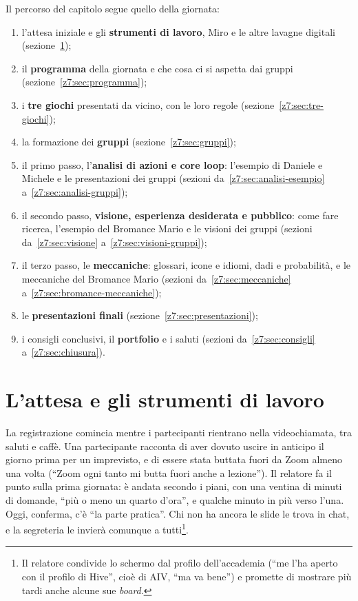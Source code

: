 Il percorso del capitolo segue quello della giornata:
\begin{enumerate}
  \item l'attesa iniziale e gli \textbf{strumenti di lavoro}, Miro e le altre
        lavagne digitali (sezione~\ref{z7:sec:avvio});
  \item il \textbf{programma} della giornata e che cosa ci si aspetta dai gruppi
        (sezione~\ref{z7:sec:programma});
  \item i \textbf{tre giochi} presentati da vicino, con le loro regole
        (sezione~\ref{z7:sec:tre-giochi});
  \item la formazione dei \textbf{gruppi} (sezione~\ref{z7:sec:gruppi});
  \item il primo passo, l'\textbf{analisi di azioni e core loop}: l'esempio
        di Daniele e Michele e le presentazioni dei gruppi (sezioni
        da~\ref{z7:sec:analisi-esempio} a~\ref{z7:sec:analisi-gruppi});
  \item il secondo passo, \textbf{visione, esperienza desiderata e pubblico}:
        come fare ricerca, l'esempio del Bromance Mario e le visioni dei gruppi
        (sezioni da~\ref{z7:sec:visione} a~\ref{z7:sec:visioni-gruppi});
  \item il terzo passo, le \textbf{meccaniche}: glossari, icone e idiomi, dadi e
        probabilità, e le meccaniche del Bromance Mario (sezioni
        da~\ref{z7:sec:meccaniche} a~\ref{z7:sec:bromance-meccaniche});
  \item le \textbf{presentazioni finali} (sezione~\ref{z7:sec:presentazioni});
  \item i consigli conclusivi, il \textbf{portfolio} e i saluti (sezioni
        da~\ref{z7:sec:consigli} a~\ref{z7:sec:chiusura}).
\end{enumerate}

\section{L'attesa e gli strumenti di lavoro}
\label{z7:sec:avvio}

La registrazione comincia mentre i partecipanti rientrano nella videochiamata,
tra saluti e caffè. Una partecipante racconta di aver dovuto uscire in anticipo
il giorno prima per un imprevisto, e di essere stata buttata fuori da Zoom
almeno una volta (``Zoom ogni tanto mi butta fuori anche a lezione''). Il
relatore fa il punto sulla prima giornata: è andata secondo i piani, con una
ventina di minuti di domande, ``più o meno un quarto d'ora'', e qualche minuto
in più verso l'una. Oggi, conferma, c'è ``la parte pratica''. Chi non ha ancora
le slide le trova in chat, e la segreteria le invierà comunque a
tutti\footnote{Il relatore condivide lo schermo dal profilo dell'accademia
(``me l'ha aperto con il profilo di Hive'', cioè di AIV, ``ma va bene'') e
promette di mostrare più tardi anche alcune sue \emph{board}.}.


